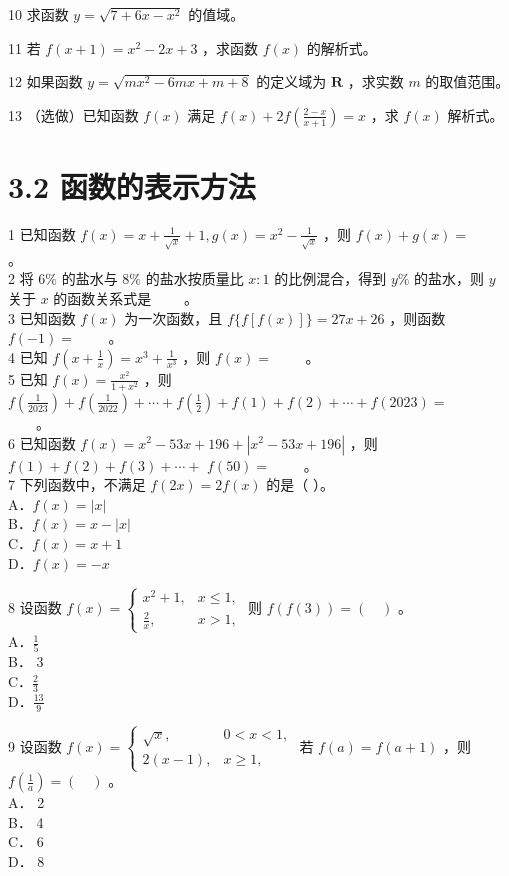 \documentclass[10pt]{article}
\begin{document}
10 求函数 \(y=\sqrt{7+6 x-x^{2}}\) 的值域。

11 若 \(f(x+1)=x^{2}-2 x+3\) ，求函数 \(f(x)\) 的解析式。

12 如果函数 \(y=\sqrt{m x^{2}-6 m x+m+8}\) 的定义域为 \(\mathbf{R}\) ，求实数 \(m\) 的取值范围。

13 （选做）已知函数 \(f(x)\) 满足 \(f(x)+2 f\left(\frac{2-x}{x+1}\right)=x\) ，求 \(f(x)\) 解析式。

\section*{3.2 函数的表示方法}
1 已知函数 \(f(x)=x+\frac{1}{\sqrt{x}}+1, g(x)=x^{2}-\frac{1}{\sqrt{x}}\) ，则 \(f(x)+g(x)=\) \(\qquad\)。\\
2 将 \(6 \%\) 的盐水与 \(8 \%\) 的盐水按质量比 \(x: 1\) 的比例混合，得到 \(y \%\) 的盐水，则 \(y\) 关于 \(x\) 的函数关系式是 \(\qquad\)。\\
3 已知函数 \(f(x)\) 为一次函数，且 \(f\{f[f(x)]\}=27 x+26\) ，则函数 \(f(-1)=\) \(\qquad\)。\\
4 已知 \(f\left(x+\frac{1}{x}\right)=x^{3}+\frac{1}{x^{3}}\) ，则 \(f(x)=\) \(\qquad\)。\\
5 已知 \(f(x)=\frac{x^{2}}{1+x^{2}}\) ，则 \(f\left(\frac{1}{2023}\right)+f\left(\frac{1}{2022}\right)+\cdots+f\left(\frac{1}{2}\right)+f(1)+f(2)+\cdots+f(2023)=\)\\
\(\qquad\)。\\
6 已知函数 \(f(x)=x^{2}-53 x+196+\left|x^{2}-53 x+196\right|\) ，则 \(f(1)+f(2)+f(3)+\cdots+\) \(f(50)=\) \(\qquad\)。\\
7 下列函数中，不满足 \(f(2 x)=2 f(x)\) 的是（ ）。\\
A．\(f(x)=|x|\)\\
B．\(f(x)=x-|x|\)\\
C．\(f(x)=x+1\)\\
D．\(f(x)=-x\)

8 设函数 \(f(x)=\left\{\begin{array}{ll}x^{2}+1, & x \leqslant 1, \\ \frac{2}{x}, & x>1,\end{array}\right.\) 则 \(f(f(3))=(\quad)\) 。\\
A．\(\frac{1}{5}\)\\
B． 3\\
C．\(\frac{2}{3}\)\\
D．\(\frac{13}{9}\)

9 设函数 \(f(x)=\left\{\begin{array}{ll}\sqrt{x}, & 0<x<1, \\ 2(x-1), & x \geqslant 1,\end{array}\right.\) 若 \(f(a)=f(a+1)\) ，则 \(f\left(\frac{1}{a}\right)=(\quad)\) 。\\
A． 2\\
B． 4\\
C． 6\\
D． 8
\end{document}
